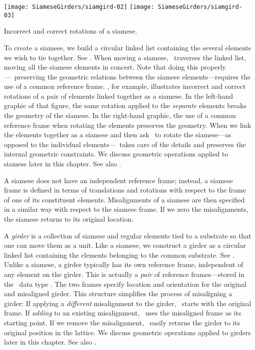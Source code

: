 \begin{marginfigure}
  \texttt{[image: SiameseGirders/siamgird-02]}\quad
  \texttt{[image: SiameseGirders/siamgird-03]}
  \caption{Incorrect and correct rotations of a siamese.}
  \label{fig:siamese.rot}
\end{marginfigure}

To create a siamese, we build a circular linked list containing
the several elements we wish to tie together. See .
When moving a siamese, \PTC\ traverses the linked list, moving
all the siamese elements in concert. Note that doing this
properly---\ie\ preserving the geometric relations between the
siamese elements---requires the use of a common reference frame.
, for example, illustrates incorrect and correct rotations of a pair of elements linked together as a siamese.
In the left-hand graphic of that figure, the same rotation applied
to the \emph{separate} elements breaks the geometry of the siamese.
In the right-hand graphic, the use of a common reference frame when
rotating the elements preserves the geometry. When we link the
elements together as a siamese and then ask \PTC\ to rotate the
siamese---as opposed to the individual elements---\PTC\ takes care
of the details and preserves the internal geometric constraints.
We discuss geometric operations applied to siamese later in this
chapter. See also .

A siamese does not have an independent reference frame; instead, a
siamese frame is defined in terms of translations and rotations with
respect to the frame of one of its constituent elements. Misalignments
of a siamese are then specified in a similar way with respect to the
siamese frame. If we zero the misalignments, the siamese returns to
its original location.

%
A \emph{girder} is a collection of siamese and regular elements
tied to a substrate so that one can move them as a unit. Like a
siamese, we construct a girder as a circular linked list containing
the elements belonging to the common substrate. See .
Unlike a siamese, a girder typically has its own reference frame,
independent of any element on the girder. This is actually a
\emph{pair} of reference frames---stored in the \PTC\ data type
. The two frames specify location and
orientation for the original and misaligned girder. This structure
simplifies the process of misaligning a girder: If applying a
\emph{different} misalignment to the girder, \PTC\ starts with
the original frame. If \emph{adding} to an existing misalignment,
\PTC\ uses the misaligned frame as its starting point. If we remove
the misalignment, \PTC\ easily returns the girder to its original
position in the lattice. We discuss geometric operations applied
to girders later in this chapter. See also .

